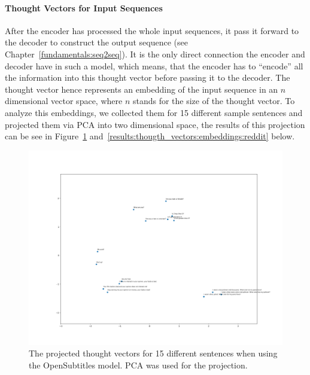 \paragraph{Thought Vectors for Input Sequences}After the encoder has processed the whole input sequences, it pass it forward to the decoder to construct the output sequence (see Chapter~\ref{fundamentals:seq2seq}). It is the only direct connection the encoder and decoder have in such a model, which means, that the encoder has to ``encode'' all the information into this thought vector before passing it to the decoder. The thought vector hence represents an embedding of the input sequence in an $n$ dimensional vector space, where $n$ stands for the size of the thought vector. To analyze this embeddings, we collected them for 15 different sample sentences and projected them via PCA into two dimensional space, the results of this projection can be see in Figure~\ref{results:thougth_vectors:embeddings:opensubtitles} and~\ref{results:thougth_vectors:embeddings:reddit} below.

\begin{figure}[H]
	\centering
	\includegraphics[width=16cm]{img/opensubtitles_thought_vector_embeddings.png}
	\caption{The projected thought vectors for 15 different sentences when using the OpenSubtitles model. PCA was used for the projection.}
	\label{results:thougth_vectors:embeddings:opensubtitles}
\end{figure}


